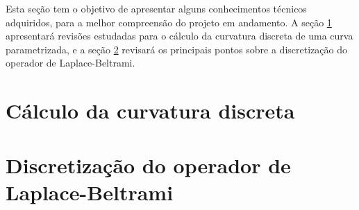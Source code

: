 Esta seção tem o objetivo de apresentar alguns conhecimentos técnicos adquiridos, para a melhor compreensão do projeto em andamento. A seção \ref{sec:curvatura} apresentará revisões estudadas para o cálculo da curvatura discreta de uma curva parametrizada, e a seção \ref{sec:laplace} revisará os principais pontos sobre a discretização do operador de Laplace-Beltrami.


\section{Cálculo da curvatura discreta}\label{sec:curvatura}

\section{Discretização do operador de Laplace-Beltrami}\label{sec:laplace}

